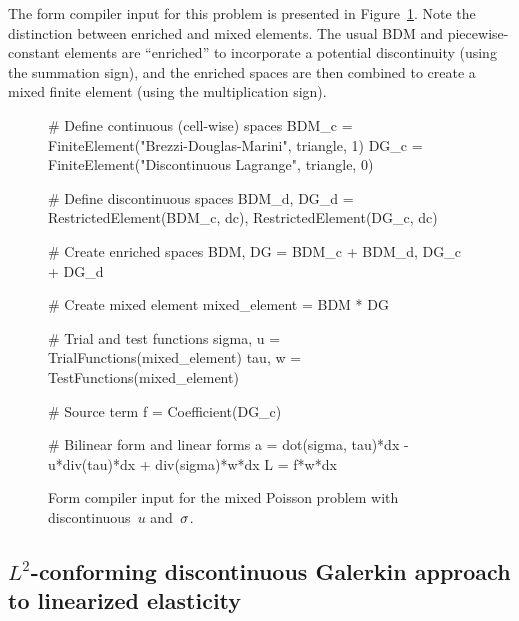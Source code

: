 The form compiler input for this problem is presented in
Figure~\ref{code:nikbakht:mixed-Poisson}.  Note the distinction
between enriched and mixed elements.  The usual BDM and
piecewise-constant elements are ``enriched'' to incorporate a
potential discontinuity (using the summation sign), and the enriched
spaces are then combined to create a mixed finite element (using the
multiplication sign).
%
\begin{figure}
\bwfig
\begin{python}
# Define continuous (cell-wise) spaces
BDM_c = FiniteElement("Brezzi-Douglas-Marini", triangle, 1)
DG_c  = FiniteElement("Discontinuous Lagrange", triangle, 0)

# Define discontinuous spaces
BDM_d, DG_d = RestrictedElement(BDM_c, dc), RestrictedElement(DG_c, dc)

# Create enriched spaces
BDM, DG = BDM_c + BDM_d, DG_c + DG_d

# Create mixed element
mixed_element = BDM * DG

# Trial and test functions
sigma, u = TrialFunctions(mixed_element)
tau, w   = TestFunctions(mixed_element)

# Source term
f = Coefficient(DG_c)

# Bilinear form and linear forms
a = dot(sigma, tau)*dx - u*div(tau)*dx + div(sigma)*w*dx
L = f*w*dx
\end{python}
\caption{Form compiler input for the mixed Poisson problem with
discontinuous~$u$ and~$\sigma$.}
\label{code:nikbakht:mixed-Poisson}
\end{figure}

\subsection{$L^{2}$-conforming discontinuous Galerkin approach to
linearized elasticity}

